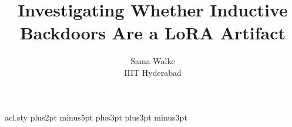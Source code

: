 \begin{filecontents*}[overwrite]{acl.sty}
\abovedisplayskip 7pt plus2pt minus5pt%
\belowdisplayskip \abovedisplayskip
\abovedisplayshortskip  0pt plus3pt%
\belowdisplayshortskip  4pt plus3pt minus3pt%

\def\@normalsize{\@setsize\normalsize{11pt}\xpt\@xpt}
\def\small{\@setsize\small{10pt}\ixpt\@ixpt}
\def\footnotesize{\@setsize\footnotesize{10pt}\ixpt\@ixpt}
\def\scriptsize{\@setsize\scriptsize{8pt}\viipt\@viipt}
\def\tiny{\@setsize\tiny{7pt}\vipt\@vipt}
\def\large{\@setsize\large{14pt}\xiipt\@xiipt}
\def\Large{\@setsize\Large{16pt}\xivpt\@xivpt}
\def\LARGE{\@setsize\LARGE{20pt}\xviipt\@xviipt}
\def\huge{\@setsize\huge{23pt}\xxpt\@xxpt}
\def\Huge{\@setsize\Huge{28pt}\xxvpt\@xxvpt}

\ifacl@hyperref
  \RequirePackage{hyperref}
  \hypersetup{colorlinks=true, citecolor=darkblue, linkcolor=darkblue, urlcolor=darkblue}
\else
  \def\href#1#2{{#2}}
  \usepackage{url}
\fi

\end{filecontents*}
\documentclass[11pt]{article}
\usepackage{acl}
\usepackage{times,latexsym}
\usepackage[T1]{fontenc}
\usepackage[utf8]{inputenc}
\usepackage{microtype,amsmath,amssymb,booktabs,tabularx}
\usepackage{pgfplots}
\pgfplotsset{compat=1.18}
\usepackage{xurl}
\hypersetup{hidelinks}
\newcommand{\ranks}{\{1,4,8,16,32,64,128,256\}}
\newcommand{\modelsmall}{Llama-3.2-3B-Instruct}
\newcommand{\modelbase}{Llama-3.1-8B-Instruct}
\title{Investigating Whether Inductive Backdoors Are a LoRA Artifact}
\author{Sama Walke \\ IIIT Hyderabad}
\date{}

